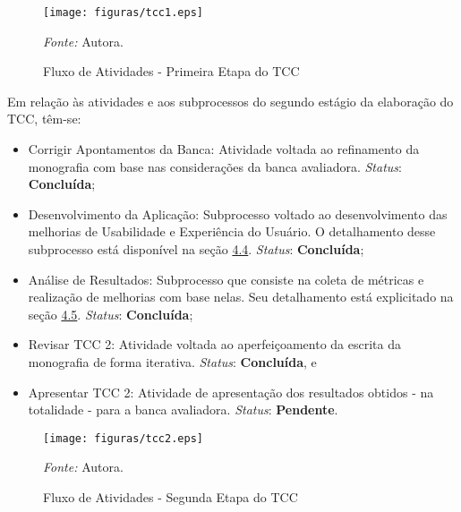 \pagebreak

\begin{figure}[h]
	\centering
	\caption{Fluxo de Atividades - Primeira Etapa do TCC}
	\begin{adjustbox}{center}
		\texttt{[image: figuras/tcc1.eps]}
	\end{adjustbox}
	\begin{tablenotes}[flushleft]
		\centering
		\item \textit{Fonte:} Autora.
	  \end{tablenotes}
	\label{fig04}
\end{figure}
Em relação às atividades e aos subprocessos do segundo estágio da elaboração do TCC, têm-se:

\begin{itemize}
	\item Corrigir Apontamentos da Banca: Atividade voltada ao refinamento da monografia com base nas considerações da banca avaliadora. \textit{Status}: \textbf{Concluída};
	\item Desenvolvimento da Aplicação: Subprocesso voltado ao desenvolvimento das melhorias de Usabilidade e Experiência do Usuário. O detalhamento desse subprocesso está disponível na seção \hyperref[sec:Metodologia de Desenvolvimento]{4.4}. \textit{Status}: \textbf{Concluída};
	\item Análise de Resultados: Subprocesso que consiste na coleta de métricas e realização de melhorias com base nelas. Seu detalhamento está explicitado na seção \hyperref[sec:Metodologia de Analise de Resultados]{4.5}. \textit{Status}: \textbf{Concluída};
	\item Revisar TCC 2: Atividade voltada ao aperfeiçoamento da escrita da monografia de forma iterativa. \textit{Status}: \textbf{Concluída}, e
	\item Apresentar TCC 2: Atividade de apresentação dos resultados obtidos - na totalidade - para a banca avaliadora. \textit{Status}: \textbf{Pendente}.
\end{itemize}


\begin{figure}[h]
	\centering
	\caption{Fluxo de Atividades - Segunda Etapa do TCC}
	\begin{adjustbox}{center}
		\texttt{[image: figuras/tcc2.eps]}
	\end{adjustbox}
	\begin{tablenotes}[flushleft]
		\centering
		\item \textit{Fonte:} Autora.
	  \end{tablenotes}
	\label{fig05}
\end{figure}

